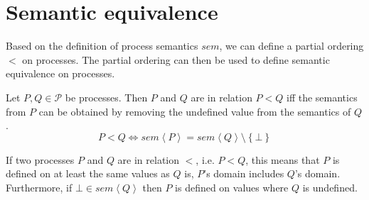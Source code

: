 



\section{Semantic equivalence}
Based on the definition of process semantics $sem$, we can define a partial ordering $<$ on processes. The partial ordering can then be used to define semantic equivalence on processes.



\begin{definition}
\label{def:process_ordering}
Let $P, Q \in \mathcal{P}$ be processes. Then $P$ and $Q$ are in relation $P < Q$ iff the semantics from $P$ can be obtained by removing the undefined value from the semantics of $Q$.
  \begin{equation}
    P < Q \Leftrightarrow sem \left\langle P \right\rangle = sem \left\langle Q \right\rangle \setminus \left\{ \bot \right\}
  \end{equation}
  \hfill\qedsymbol
\end{definition}



If two processes $P$ and $Q$ are in relation $<$, i.e. $P < Q$, this means that $P$ is defined on at least the same values as $Q$ is, $P$'s domain includes $Q$'s domain. Furthermore, if $\bot \in sem \left\langle Q \right\rangle$ then $P$ is defined on values where $Q$ is undefined.

